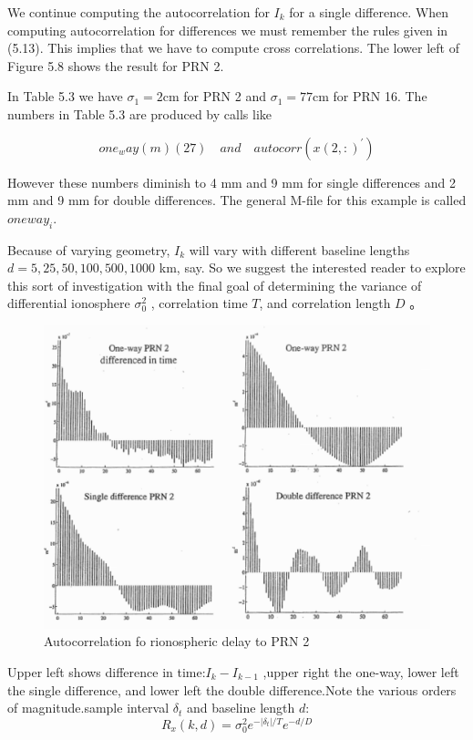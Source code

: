  We continue computing the autocorrelation for $ I_{k} $ for a single difference. When computing autocorrelation for differences we must remember the rules given in (5.13). This implies that we have to compute cross correlations. The lower left of Figure 5.8 shows the result for PRN 2. 
 
 In Table 5.3 we have $ \sigma_{1}=2 $cm for PRN 2 and $ \sigma_{1}=77 $cm for PRN 16. The numbers in Table 5.3 are produced by calls like 
 
 \[ one_way(m)(27)\quad and \quad autocorr(x(2,:)^{'}) \]
 
 However these numbers diminish to 4 mm and 9 mm for single differences and 2 mm and 9 mm for double differences. The general M-file for this example is called $ oneway_{i} $.
 
 Because of varying geometry, $ I_{k} $ will vary with different baseline lengths $  d = 5, 25, 50, 100,500, 1000 $ km, say. So we suggest the interested reader to explore this sort of investigation with the final goal of determining the variance of differential ionosphere $ \sigma_{0}^{2} $ , correlation time $  T  $, and correlation length $ D $ 。
 
 \begin{figure}[h]
 	\centering
 	\includegraphics[width=0.7\linewidth]{TeX_files/Part02/chapter05/image/8}
 	\caption{Autocorrelation fo rionospheric delay to PRN 2}
 	\label{ }
 \end{figure}
 
 
  Upper left shows difference in time:$ I_{k}-I_{k-1} $ ,upper right the one-way, lower left the single difference, and lower left the double difference.Note the various orders of magnitude.sample interval $ \delta_{t} $ and baseline length $ d $:
 \begin{equation}\label{5.40}
  R_{x}(k,d)=\sigma_{0}^{2}e^{-|\delta_{t}|/T} e^{-d/D}
 \end{equation}
  
